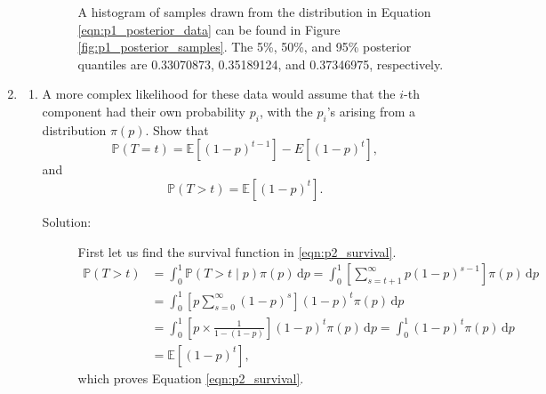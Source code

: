 \documentclass[letterpaper,11pt]{article}
\begin{document}
\begin{enumerate}
\begin{enumerate}
\begin{description}
      A histogram of samples drawn from the distribution in Equation
      \ref{eqn:p1_posterior_data} can be found in Figure
      \ref{fig:p1_posterior_samples}. The 5\%, 50\%, and 95\% posterior
      quantiles are 0.33070873, 0.35189124, and 0.37346975, respectively.
    \end{description}
  \end{enumerate}
\item
  \begin{enumerate}
  \item A more complex likelihood for these data would assume that the $i$-th
    component had their own probability $p_i$, with the $p_i$'s arising from a
    distribution $\pi\left(p\right)$. Show that
      \begin{equation}
        \mathbb{P}\left(T = t\right) =
        \mathbb{E}\left[(1 - p)^{t-1}\right] -
        E[(1 - p)^t],
        \label{eqn:p2_pmf}
      \end{equation}
      and
      \begin{equation}
        \mathbb{P}\left(T > t\right) = \mathbb{E}\left[(1 - p)^t\right].
        \label{eqn:p2_survival}
      \end{equation}
      \begin{description}
      \item[Solution:] First let us find the survival function in
        \ref{eqn:p2_survival}.
        \begin{align*}
          \mathbb{P}\left(T > t\right)
          &= \int_0^1
          \mathbb{P}\left(T > t \mid p\right)
          \pi\left(p\right)\,\mathrm{d}p 
          = \int_0^1 \left[\sum_{s=t + 1}^\infty p(1 - p)^{s-1}\right]
            \pi\left(p\right)
          \,\mathrm{d}p \\
          &= \int_0^1 \left[p\sum_{s=0}^\infty (1 - p)^s\right]
            (1 - p)^t
            \pi\left(p\right)
            \,\mathrm{d}p \\
          &= \int_0^1 \left[p \times \frac{1}{1 - (1-p)}\right]
            (1 - p)^t
            \pi\left(p\right)
            \,\mathrm{d}p
          = \int_0^1 (1 - p)^t
            \pi\left(p\right)
            \,\mathrm{d}p \\
          &= \mathbb{E}\left[\left(1-p\right)^t\right],
        \end{align*}
        which proves Equation \ref{eqn:p2_survival}.


\end{description}
\end{enumerate}
\end{enumerate}
\end{document}
